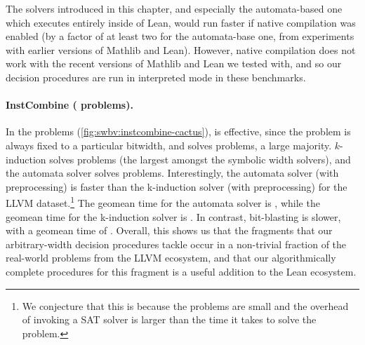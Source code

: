 The solvers introduced in this chapter, and especially the automata-based one
which executes entirely inside of Lean, would run faster if native compilation
was enabled (by a factor of at least two for the automata-base one, from
experiments with earlier versions of Mathlib and Lean). However, native
compilation does not work with the recent versions of Mathlib and Lean we tested
with, and so our decision procedures are run in interpreted mode in these
benchmarks.

\paragraph{InstCombine (\InstCombineTotalProblems{} problems).} In the \InstCombineTotalProblems{} problems (\autoref{fig:swbv:instcombine-cactus}),
\bvdecide{} is effective, since the problem is always fixed to a particular bitwidth,
and solves \InstCombineBvDecideNumSolved{} problems, a large majority.
$k$-induction solves \InstCombineNormCircuitVerifiedNumSolved{} problems (the largest amongst the symbolic width solvers),
and the automata solver solves \InstCombineNormPresburgerNumSolved{} problems.
Interestingly, the automata solver (with preprocessing) is faster than the k-induction solver (with preprocessing) for the LLVM dataset.\footnote{We conjecture that this is because the problems are small and the overhead of invoking a SAT solver is larger than the time it takes to solve the problem.}
The geomean time for the automata solver is \InstCombineNormPresburgerGeoMean{}, while the geomean time for the k-induction solver is \InstCombineNormCircuitVerifiedGeoMean{}. In contrast, bit-blasting is slower, with a geomean time of \InstCombineBvDecideGeoMean{}.
Overall, this shows us that the fragments that our arbitrary-width decision procedures tackle occur in a non-trivial fraction of the real-world problems from the LLVM ecosystem,
and that our algorithmically complete procedures for this fragment is a useful addition to the Lean ecosystem.

